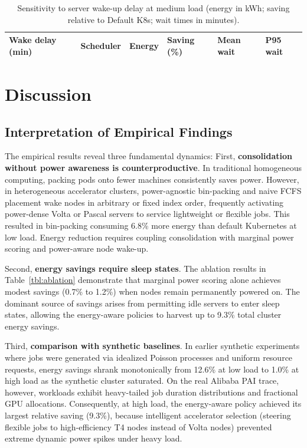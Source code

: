 \documentclass[a4paper,fleqn]{cas-dc}
\begin{document}
\begin{table}
\caption{Sensitivity to server wake-up delay at medium load (energy in kWh; saving relative to Default K8s; wait times in minutes).}\label{tbl:wake}
\begin{tabular*}{\tblwidth}{@{}LLLLLL@{}}
\toprule
Wake delay (min) & Scheduler & Energy & Saving (\%) & Mean wait & P95 wait \\
\midrule

\bottomrule
\end{tabular*}
\end{table}

\section{Discussion}\label{sec:discussion}

\subsection{Interpretation of Empirical Findings}
The empirical results reveal three fundamental dynamics:
First, \textbf{consolidation without power awareness is counterproductive}. In traditional homogeneous computing, packing pods onto fewer machines consistently saves power. However, in heterogeneous accelerator clusters, power-agnostic bin-packing and naive FCFS placement wake nodes in arbitrary or fixed index order, frequently activating power-dense Volta or Pascal servers to service lightweight or flexible jobs. This resulted in bin-packing consuming 6.8\% more energy than default Kubernetes at low load. Energy reduction requires coupling consolidation with marginal power scoring and power-aware node wake-up.

Second, \textbf{energy savings require sleep states}. The ablation results in Table~\ref{tbl:ablation} demonstrate that marginal power scoring alone achieves modest savings (0.7\% to 1.2\%) when nodes remain permanently powered on. The dominant source of savings arises from permitting idle servers to enter sleep states, allowing the energy-aware policies to harvest up to 9.3\% total cluster energy savings.

Third, \textbf{comparison with synthetic baselines}. In earlier synthetic experiments where jobs were generated via idealized Poisson processes and uniform resource requests, energy savings shrank monotonically from 12.6\% at low load to 1.0\% at high load as the synthetic cluster saturated. On the real Alibaba PAI trace, however, workloads exhibit heavy-tailed job duration distributions and fractional GPU allocations. Consequently, at high load, the energy-aware policy achieved its largest relative saving (9.3\%), because intelligent accelerator selection (steering flexible jobs to high-efficiency T4 nodes instead of Volta nodes) prevented extreme dynamic power spikes under heavy load.
\end{document}
